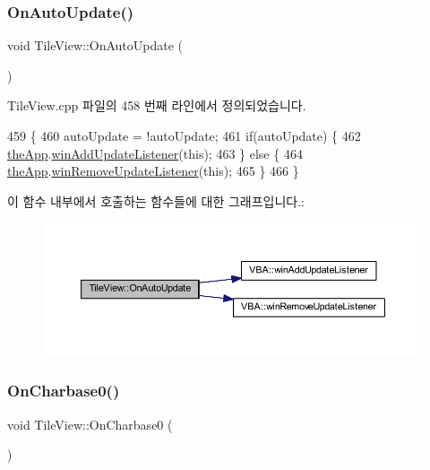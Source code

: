 \subsubsection{\texorpdfstring{On\+Auto\+Update()}{OnAutoUpdate()}}
{\footnotesize\ttfamily void Tile\+View\+::\+On\+Auto\+Update (\begin{DoxyParamCaption}{ }\end{DoxyParamCaption})\hspace{0.3cm}{\ttfamily [protected]}}



Tile\+View.\+cpp 파일의 458 번째 라인에서 정의되었습니다.


\begin{DoxyCode}
459 \{
460   autoUpdate = !autoUpdate;
461   \textcolor{keywordflow}{if}(autoUpdate) \{
462     \mbox{\hyperlink{_v_b_a_8cpp_a8095a9d06b37a7efe3723f3218ad8fb3}{theApp}}.\mbox{\hyperlink{class_v_b_a_af0712f70a90d023ab8327a366be08174}{winAddUpdateListener}}(\textcolor{keyword}{this});
463   \} \textcolor{keywordflow}{else} \{
464     \mbox{\hyperlink{_v_b_a_8cpp_a8095a9d06b37a7efe3723f3218ad8fb3}{theApp}}.\mbox{\hyperlink{class_v_b_a_a2d31a0656df2230310aa8dc9e3a735d3}{winRemoveUpdateListener}}(\textcolor{keyword}{this});    
465   \}  
466 \}
\end{DoxyCode}
이 함수 내부에서 호출하는 함수들에 대한 그래프입니다.\+:
\nopagebreak
\begin{figure}[H]
\begin{center}
\leavevmode
\includegraphics[width=350pt]{class_tile_view_ab51dcedc72c43cf57133d4adcd264c10_cgraph}
\end{center}
\end{figure}
\mbox{\label{class_tile_view_a5b1b1e61396178f21ee28c6c7a779142}} 
\subsubsection{\texorpdfstring{On\+Charbase0()}{OnCharbase0()}}
{\footnotesize\ttfamily void Tile\+View\+::\+On\+Charbase0 (\begin{DoxyParamCaption}{ }\end{DoxyParamCaption})\hspace{0.3cm}{\ttfamily [protected]}}



